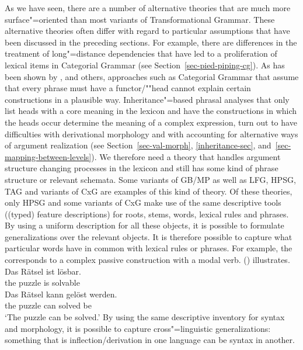 As we have seen, there are a number of alternative theories that are much more surface"=oriented than
most variants of Transformational Grammar. These alternative theories often differ with
regard to particular assumptions that have been discussed in the preceding sections. For example, there are differences in the treatment of long"=distance dependencies that
have led to a proliferation of lexical items in Categorial Grammar (see Section~\ref{sec-pied-piping-cg}). As has been shown by \citet{Jacobs2008a}, \citet{Jackendoff2008a}
and others, approaches such as Categorial Grammar that assume that every phrase must have a functor/""head cannot explain certain constructions in a plausible way.
Inheritance"=based phrasal analyses that only list heads with a core meaning in the lexicon and have the constructions in which the heads occur determine the meaning
of a complex expression, turn out to have difficulties with derivational morphology and with
accounting for alternative ways of argument realization (see Section~\ref{sec-val-morph},
\ref{inheritance-sec}, and~\ref{sec-mapping-between-levels}).
We therefore need a theory that handles argument structure changing processes in the lexicon and still has some kind of phrase structure or relevant schemata. Some variants
of GB/MP as well as LFG, HPSG, TAG and variants of CxG are examples of this kind of theory. Of these
theories, only HPSG and some variants of CxG make use of the same descriptive tools ((typed) feature
descriptions) for roots, stems, words, lexical rules and phrases. By using a uniform description for
all these objects, it is possible to formulate generalizations over the relevant objects. It is therefore
possible to capture what particular words have in common with lexical rules or phrases.
For example, the \bard{} corresponds to a complex passive construction with
a modal verb. () illustrates.
\eal
\ex 
\gll Das Rätsel ist lösbar.\\
     the puzzle is solvable\\
\ex 
\gll Das Rätsel kann gelöst werden.\\
     the puzzle can solved be\\
\glt `The puzzle can be solved.'
\zl
By using the same descriptive inventory for syntax and morphology, it is possible to capture
cross"=linguistic generalizations: something that is inflection/derivation in one language can be syntax in another.

